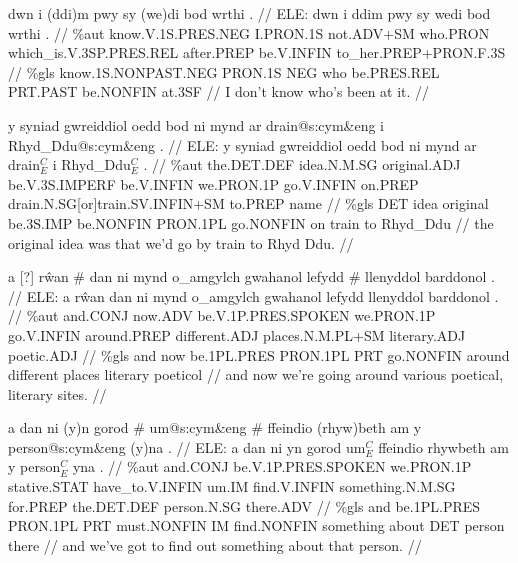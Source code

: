 \documentclass[a4paper,10pt]{article}
\begin{document}
\ex
\begingl[lingstyle=gergl]
\glchat dwn i (ddi)m pwy sy (we)di bod wrthi . //
\glsurface ELE:  dwn i ddim pwy sy wedi bod wrthi .  //
\glauto \%aut  know{\scriptsize .V.1S.PRES.NEG} I{\scriptsize .PRON.1S} not{\scriptsize .ADV+SM} who{\scriptsize .PRON} which\_is{\scriptsize .V.3SP.PRES.REL} after{\scriptsize .PREP} be{\scriptsize .V.INFIN} to\_her{\scriptsize .PREP+PRON.F.3S}   //
\glmanual \%gls  know{\scriptsize .1S.NONPAST.NEG} PRON{\scriptsize .1S} NEG who be{\scriptsize .PRES.REL} PRT{\scriptsize .PAST} be{\scriptsize .NONFIN} at{\scriptsize .3SF}   //
\gleng I don't know who's been at it. //
\endgl
\xe

\ex
\begingl[lingstyle=gergl]
\glchat y syniad gwreiddiol oedd bod ni mynd ar drain@s:cym\&eng i Rhyd\_Ddu@s:cym\&eng . //
\glsurface ELE:  y syniad gwreiddiol oedd bod ni mynd ar drain$^{C}_{E}$ i Rhyd\_Ddu$^{C}_{E}$ .  //
\glauto \%aut  the{\scriptsize .DET.DEF} idea{\scriptsize .N.M.SG} original{\scriptsize .ADJ} be{\scriptsize .V.3S.IMPERF} be{\scriptsize .V.INFIN} we{\scriptsize .PRON.1P} go{\scriptsize .V.INFIN} on{\scriptsize .PREP} drain{\scriptsize .N.SG[or]train.SV.INFIN+SM} to{\scriptsize .PREP} name   //
\glmanual \%gls  DET idea original be{\scriptsize .3S.IMP} be{\scriptsize .NONFIN} PRON{\scriptsize .1PL} go{\scriptsize .NONFIN} on train to Rhyd\_Ddu   //
\gleng the original idea was that we'd go by train to Rhyd Ddu. //
\endgl
\xe

\ex
\begingl[lingstyle=gergl]
\glchat a [?] rŵan \# dan ni mynd o\_amgylch gwahanol lefydd \# llenyddol barddonol . //
\glsurface ELE:  a rŵan dan ni mynd o\_amgylch gwahanol lefydd llenyddol barddonol .  //
\glauto \%aut  and{\scriptsize .CONJ} now{\scriptsize .ADV} be{\scriptsize .V.1P.PRES.SPOKEN} we{\scriptsize .PRON.1P} go{\scriptsize .V.INFIN} around{\scriptsize .PREP} different{\scriptsize .ADJ} places{\scriptsize .N.M.PL+SM} literary{\scriptsize .ADJ} poetic{\scriptsize .ADJ}   //
\glmanual \%gls  and now be{\scriptsize .1PL.PRES} PRON{\scriptsize .1PL} PRT go{\scriptsize .NONFIN} around different places literary poeticol  //
\gleng and now we're going around various poetical, literary sites. //
\endgl
\xe

\ex
\begingl[lingstyle=gergl]
\glchat a dan ni (y)n gorod \# um@s:cym\&eng \# ffeindio (rhyw)beth am y person@s:cym\&eng (y)na . //
\glsurface ELE:  a dan ni yn gorod um$^{C}_{E}$ ffeindio rhywbeth am y person$^{C}_{E}$ yna .  //
\glauto \%aut  and{\scriptsize .CONJ} be{\scriptsize .V.1P.PRES.SPOKEN} we{\scriptsize .PRON.1P} stative{\scriptsize .STAT} have\_to{\scriptsize .V.INFIN} um{\scriptsize .IM} find{\scriptsize .V.INFIN} something{\scriptsize .N.M.SG} for{\scriptsize .PREP} the{\scriptsize .DET.DEF} person{\scriptsize .N.SG} there{\scriptsize .ADV}   //
\glmanual \%gls  and be{\scriptsize .1PL.PRES} PRON{\scriptsize .1PL} PRT must{\scriptsize .NONFIN} IM find{\scriptsize .NONFIN} something about DET person there   //
\gleng and we've got to find out something about that person. //
\endgl
\xe
\end{document}
